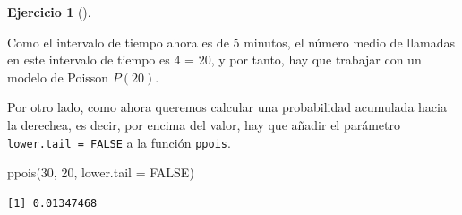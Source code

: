 \documentclass[
  a4paper,
]{scrreport}
\newenvironment{Shaded}{\begin{snugshade}}{\end{snugshade}}
\newcommand{\AttributeTok}[1]{\textcolor[rgb]{0.40,0.45,0.13}{#1}}
\newcommand{\ConstantTok}[1]{\textcolor[rgb]{0.56,0.35,0.01}{#1}}
\newcommand{\DecValTok}[1]{\textcolor[rgb]{0.68,0.00,0.00}{#1}}
\newcommand{\FunctionTok}[1]{\textcolor[rgb]{0.28,0.35,0.67}{#1}}
\newcommand{\NormalTok}[1]{\textcolor[rgb]{0.00,0.23,0.31}{#1}}
\theoremstyle{definition}
\newtheorem{exercise}{Ejercicio}[chapter]
\theoremstyle{remark}
\begin{document}
\begin{exercise}[]
\begin{enumerate}
  \begin{tcolorbox}[enhanced jigsaw, toprule=.15mm, rightrule=.15mm, arc=.35mm, colback=white, colbacktitle=quarto-callout-tip-color!10!white, toptitle=1mm, left=2mm, colframe=quarto-callout-tip-color-frame, opacityback=0, breakable, opacitybacktitle=0.6, bottomtitle=1mm, titlerule=0mm, title=\textcolor{quarto-callout-tip-color}{\faLightbulb}\hspace{0.5em}{Solución}, bottomrule=.15mm, coltitle=black, leftrule=.75mm]

  Como el intervalo de tiempo ahora es de 5 minutos, el número medio de
  llamadas en este intervalo de tiempo es 4 = 20, y por tanto,
  hay que trabajar con un modelo de Poisson \(P(20)\).

  Por otro lado, como ahora queremos calcular una probabilidad acumulada
  hacia la derechea, es decir, por encima del valor, hay que añadir el
  parámetro \texttt{lower.tail\ =\ FALSE} a la función \texttt{ppois}.

\begin{Shaded}
\begin{Highlighting}[]
\FunctionTok{ppois}\NormalTok{(}\DecValTok{30}\NormalTok{, }\DecValTok{20}\NormalTok{, }\AttributeTok{lower.tail =} \ConstantTok{FALSE}\NormalTok{)}
\end{Highlighting}
\end{Shaded}

\begin{verbatim}
[1] 0.01347468
\end{verbatim}

  \end{tcolorbox}
\end{enumerate}

\end{exercise}
\end{document}
